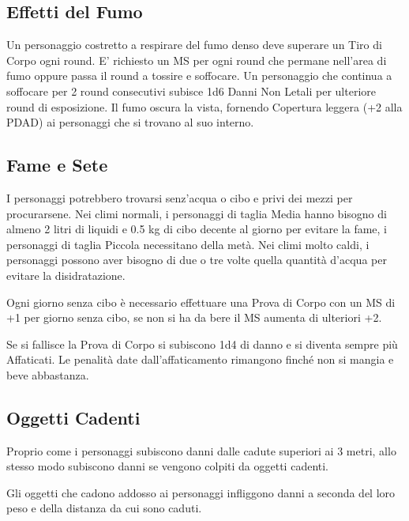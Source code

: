\documentclass[12pt,a4paper,twoside,openany]{book}
\begin{document}
\begin{multicols}{2}
\subsection{Effetti del Fumo}

\label{effetti-del-fumo}

Un personaggio costretto a respirare del fumo denso deve superare un Tiro di Corpo ogni round. E' richiesto un MS per ogni round che permane nell'area di fumo oppure passa il round a tossire e soffocare. Un personaggio che continua a soffocare per 2 round consecutivi subisce 1d6 Danni Non Letali per ulteriore round di esposizione. Il fumo oscura la vista, fornendo Copertura leggera (+2 alla PDAD) ai personaggi che si trovano al suo interno.

\subsection{Fame e Sete}

\label{fame-e-sete}

I personaggi potrebbero trovarsi senz'acqua o cibo e privi dei mezzi per procurarsene. Nei climi normali, i personaggi di taglia Media hanno bisogno di almeno 2 litri di liquidi e 0.5 kg di cibo decente al giorno per evitare la fame, i personaggi di taglia Piccola necessitano della metà. Nei climi molto caldi, i personaggi possono aver bisogno di due o tre volte quella quantità d'acqua per evitare la disidratazione.

Ogni giorno senza cibo è necessario effettuare una Prova di Corpo con un MS di +1 per giorno senza cibo, se non si ha da bere il MS aumenta di ulteriori +2.

Se si fallisce la Prova di Corpo si subiscono 1d4 di danno e si diventa sempre più Affaticati. Le penalità date dall'affaticamento rimangono finché non si mangia e beve abbastanza.

\subsection{Oggetti Cadenti}

\label{oggetti-cadenti}

Proprio come i personaggi subiscono danni dalle cadute superiori ai 3 metri, allo stesso modo subiscono danni se vengono colpiti da oggetti cadenti.

Gli oggetti che cadono addosso ai personaggi infliggono danni a seconda del loro peso e della distanza da cui sono caduti.


\end{multicols}
\end{document}
